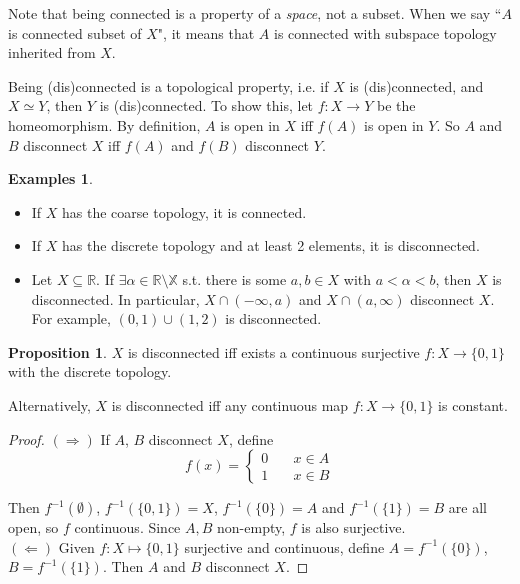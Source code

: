 \documentclass[a4paper,11pt]{article}
\theoremstyle{definition}
\newtheorem*{prop}{Proposition}
\newtheorem*{exs}{Examples}
\numberwithin{equation}{section}
\begin{document}
Note that being connected is a property of a \emph{space}, not a subset. When we say ``$A$ is connected subset of $X$", it means that $A$ is connected with subspace topology inherited from $X$.

Being (dis)connected is a topological property, i.e. if $X$ is (dis)connected, and $X\simeq Y$, then $Y$ is (dis)connected. To show this, let $f:X\rightarrow Y$ be the homeomorphism. By definition, $A$ is open in $X$ iff $f(A)$ is open in $Y$. So $A$ and $B$ disconnect $X$ iff $f(A)$ and $f(B)$ disconnect $Y$.

\begin{exs}
\leavevmode
\begin{itemize}
    \item If $X$ has the coarse topology, it is connected.
    \item If $X$ has the discrete topology and at least 2 elements, it is disconnected.
    \item Let $X\subseteq \mathbb{R}$. If $\exists\alpha\in\mathbb{R\setminus X}$ s.t. there is some $a,b\in X$ with $a<\alpha<b$, then $X$ is disconnected. In particular, $X\cap(-\infty,a)$ and $X\cap(a,\infty)$ disconnect $X$.\\
    For example, $(0,1)\cup(1,2)$ is disconnected.
\end{itemize}
\end{exs}

\begin{prop}
    $X$ is disconnected iff exists a continuous surjective $f:X\rightarrow\{0,1\}$ with the discrete topology.
    
    Alternatively, $X$ is disconnected iff any continuous map $f:X\rightarrow\{0,1\}$ is constant.
\end{prop}
\begin{proof}
$(\Rightarrow)$ If $A$, $B$ disconnect $X$, define
\[
f(x)=\left\{\begin{array}{lr}
    0\quad & x\in A \\
    1\quad & x\in B
\end{array}\right.
\]

Then $f^{-1}(\emptyset)$, $f^{-1}(\{0,1\})=X$, $f^{-1}(\{0\})=A$ and $f^{-1}(\{1\})=B$ are all open, so $f$ continuous. Since $A, B$ non-empty, $f$ is also surjective.\\
$(\Leftarrow)$ Given $f:X\mapsto\{0,1\}$ surjective and continuous, define $A=f^{-1}(\{0\})$, $B=f^{-1}(\{1\})$. Then $A$ and $B$ disconnect $X$.
\end{proof}
\end{document}
